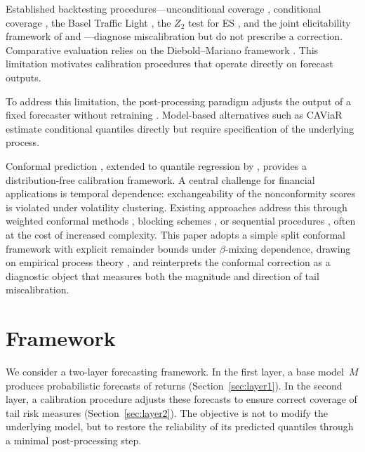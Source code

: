 \documentclass[preprint,11pt,authoryear]{elsarticle}
\newcommand{\1}{\boldsymbol{1}}
\begin{document}
	Established backtesting procedures---unconditional coverage
	\citep{kupiec1995}, conditional coverage
	\citep{christoffersen1998}, the Basel Traffic Light
	\citep{basel1996}, the $Z_2$ test for ES
	\citep{acerbi2014back}, and the joint elicitability framework
	of \citet{fissler2016higher} and
	\citet{nolde2017elicitability}---diagnose miscalibration but
	do not prescribe a correction. Comparative evaluation relies
	on the Diebold--Mariano framework
	\citep{diebold1995comparing,harvey1997testing}. This
	limitation motivates calibration procedures that operate
	directly on forecast outputs.
	
	To address this limitation, the post-processing paradigm adjusts
	the output of a fixed forecaster without retraining
	\citep{gneiting2013combining, brehmer2021properification,
		taillardat2016calibrated}. Model-based
	alternatives such as CAViaR \citep{engle2004caviar} estimate
	conditional quantiles directly but require specification of
	the underlying process.
	
	Conformal prediction \citep{vovk2005algorithmic}, extended to
	quantile regression by \citet{romano2019conformalized},
	provides a distribution-free calibration framework. A central
	challenge for financial applications is temporal dependence:
	exchangeability of the nonconformity scores is violated under volatility clustering.
	Existing approaches address this through weighted conformal
	methods \citep{barber2023conformal}, blocking schemes
	\citep{chernozhukov2018exact}, or sequential procedures
	\citep{gibbs2021adaptive, zaffran2022conformal,
		xu2024conformal}, often at the cost of increased complexity.
	This paper adopts a simple split conformal framework with
	explicit remainder bounds under $\beta$-mixing dependence,
	drawing on empirical process theory
	\citep{rio2017asymptotic, yu1994rates}, and reinterprets the
	conformal correction as a diagnostic object that measures both
	the magnitude and direction of tail miscalibration.
	
	
	
	\section{Framework}
	\label{sec:framework}
	
	We consider a two-layer forecasting framework.
	In the first layer, a base model~$M$ produces
	probabilistic forecasts of returns
	(Section~\ref{sec:layer1}).
	In the second layer, a calibration procedure adjusts
	these forecasts to ensure correct coverage of tail
	risk measures (Section~\ref{sec:layer2}).
	The objective is not to modify the
	underlying model, but to restore the reliability of
	its predicted quantiles through a minimal
	post-processing step.
	
\end{document}
